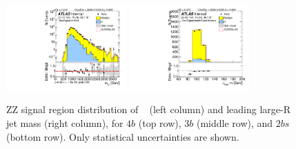 \begin{figure}[htb!]
\begin{center}
\includegraphics[width=0.41\textwidth,angle=-90]{figures/boosted/ZZ/Moriond_ZZ_TwoTag_split_Signal_mHH_l_1.pdf}
\includegraphics[width=0.41\textwidth,angle=-90]{figures/boosted/ZZ/Moriond_ZZ_TwoTag_split_Signal_leadHCand_Mass_s.pdf}\\
\end{center}
\caption{ZZ signal region distribution of \mtwoJ~ (left column) and leading large-R jet mass (right column), for $4b$ (top row), $3b$ (middle row), and $2bs$ (bottom row). Only statistical uncertainties are shown.}
\label{fig:ZZSR_Distribution}
\end{figure}

% 

% 

% 


